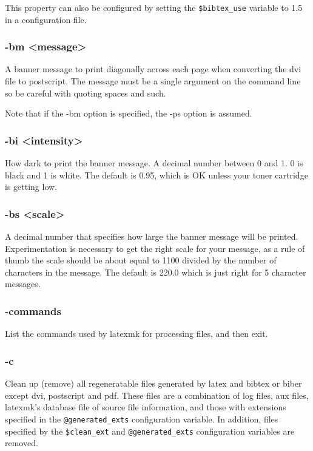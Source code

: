 This property can also be configured by setting the  \verb|$bibtex_use|
variable to 1.5 in a configuration file.


\subsubsection{-bm <message>}

A  banner message to print diagonally across each page when converting the dvi
file to postscript.  The message must be a  single argument on the command line
so be careful with quoting spaces and such.

Note that if the -bm option is specified, the -ps option is  assumed.


\subsubsection{-bi <intensity>}

How  dark to print the banner message.  A decimal number between
0 and 1.  0 is black and 1 is white.  The default is 0.95, which
is OK unless your toner cartridge is getting low.

\subsubsection{-bs <scale>}

A  decimal  number  that  specifies how large the banner message will be
printed.  Experimentation is necessary to get the  right scale  for  your
message, as a rule of thumb the scale should be about equal to 1100 divided by
the number of characters  in  the message.  The default is 220.0 which is just
right for 5 character messages.


\subsubsection{-commands}

List the commands used by latexmk for processing files, and then
exit.

\subsubsection{-c}

Clean up (remove) all regeneratable files generated by latex and bibtex or
biber except dvi, postscript and pdf.  These files are a  combination of log
files, aux files, latexmk's database file of source file information, and those
with extensions  specified in  the  \verb|@generated_exts|  configuration
variable.  In addition, files specified by the \verb|$clean_ext| and
\verb|@generated_exts| configuration variables are removed.

